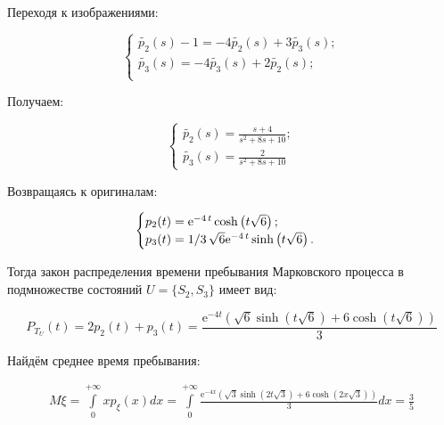 \documentclass[14pt,a4paper]{scrartcl}
\begin{document}
Переходя к изображениями:

\begin{equation*}
	\begin{cases}
		\widetilde{p_2}(s) - 1 = -4\widetilde{p_2}(s) + 3\widetilde{p_3}(s);\\
		\widetilde{p_3}(s) = -4\widetilde{p_3}(s) + 2\widetilde{p_2}(s);\\
	\end{cases}
\end{equation*}

Получаем:

\begin{equation*}
	\begin{cases}
		\widetilde{p_2}(s) = \frac{s+4}{s^{2}+8 s+10};\\
		\widetilde{p_3}(s) = \frac{2}{s^{2}+8 s+10}
	\end{cases}
\end{equation*}


Возвращаясь к оригиналам:

\begin{equation*}
	\begin{cases}
		p_2(t) = {{\rm e}^{-4\,t}}\cosh \left( t\sqrt {6} \right) ; \\
		p_3(t) = 1/3\,\sqrt {6}{{\rm e}^{-4\,t}}\sinh \left( t\sqrt {6} \right) .
	\end{cases}
\end{equation*}

Тогда закон распределения времени пребывания Марковского процесса в подмножестве состояний $U = \{S_2,S_3\}$ имеет вид:

\begin{equation*}
	P_{T_{U}}(t) = 2p_2(t) + p_3(t) = \frac{\mathrm{e}^{-4 t}(\sqrt{6} \sinh (t \sqrt{6})+6 \cosh (t \sqrt{6}))}{3}
\end{equation*}


Найдём среднее время пребывания:

\begin{equation*}
	\begin{aligned}
		M \xi=\int\limits_{0}^{+\infty} x p_{\xi}(x) dx = \int\limits_{0}^{+\infty} \frac{\mathrm{e}^{-4 x}(\sqrt{3} \sinh (2 t \sqrt{3})+6 \cosh (2 x \sqrt{3}))}{3} dx = \frac{3}{5}
		\\
	\end{aligned}
\end{equation*}
\end{document}
